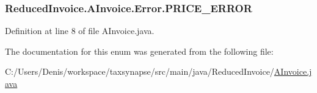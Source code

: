 \subsubsection[{\texorpdfstring{P\+R\+I\+C\+E\+\_\+\+E\+R\+R\+OR}{PRICE_ERROR}}]{\setlength{\rightskip}{0pt plus 5cm}Reduced\+Invoice.\+A\+Invoice.\+Error.\+P\+R\+I\+C\+E\+\_\+\+E\+R\+R\+OR}\hypertarget{enum_reduced_invoice_1_1_a_invoice_1_1_error_a5c521b3b1cc9827b5dba56d42a770481}{}\label{enum_reduced_invoice_1_1_a_invoice_1_1_error_a5c521b3b1cc9827b5dba56d42a770481}


Definition at line 8 of file A\+Invoice.\+java.



The documentation for this enum was generated from the following file\+:\begin{DoxyCompactItemize}
\item 
C\+:/\+Users/\+Denis/workspace/taxsynapse/src/main/java/\+Reduced\+Invoice/\hyperlink{_a_invoice_8java}{A\+Invoice.\+java}\end{DoxyCompactItemize}
